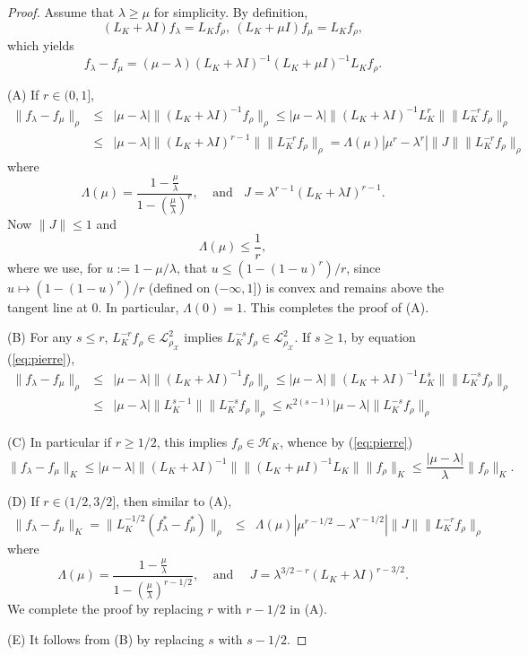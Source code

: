 \documentclass[twoside,11pt]{amsart}
\theoremstyle{theorem}
\theoremstyle{definition}
\theoremstyle{remark}
\def\L{{\mathscr L}}
\def\L2{{\mathscr L}^2_{\rho_\X}}
\def\H{{\mathscr H}}
\def\X{{\mathscr X}}
\def\la{\lambda}
\begin{document}
\begin{proof}
Assume that $\lambda\geq \mu$ for simplicity. By definition,
$$(L_K+\la I)f_\la=L_Kf_\rho,~(L_K+\mu I)f_\mu=L_K f_\rho,$$
which yields
\begin{equation} \label{eq:pierre}
f_\la-f_\mu=(\mu-\lambda)(L_K+\la I)^{-1}(L_K+\mu I)^{-1}L_Kf_\rho.
\end{equation}

(A) If $r\in (0,1]$,
\begin{eqnarray*}
\|f_{\lambda}- f_{\mu}\|_\rho & \leq & |\mu-\lambda|\|(L_K+\la I)^{-1} f_\rho \|_\rho \leq  |\mu-\lambda|\|(L_K+\la I)^{-1} L_K^r \| \|L_K^{-r}f_\rho \|_\rho  \\
& \leq & |\mu-\lambda|\|(L_K+\la I)^{r-1} \| \|L_K^{-r}f_\rho \|_\rho  = \Lambda(\mu) |\mu^r - \lambda^r|  \|J\| \|L_K^{-r} f_\rho\|_\rho
\end{eqnarray*}
where
\[ \Lambda(\mu)=\frac{1-\frac{\mu}{\lambda}}{1-\left(\frac{\mu}{\lambda}\right)^r}, \ \ \ \ \ \mbox{and}\ \ \ \  J= \lambda^{r-1} (L_K+\lambda I)^{r-1}. \]
Now $\|J\|\leq 1$ and 
\[ \Lambda(\mu) \leq \frac{1}{r}, \]
where we use, for $u:=1-\mu/\la$, that
$u\leq(1-(1-u)^r)/r$, since $u\mapsto(1-(1-u)^r)/r$
(defined on $(-\infty,1]$) is convex and remains above the tangent
line at $0$. In particular, $\Lambda(0)=1$. This completes the proof of (A).

(B) For any $s\leq r$, $L_K^{-r}f_\rho\in \L2$ implies $L_K^{-s}f_\rho \in \L2$. If $s\geq 1$, by equation (\ref{eq:pierre}),
\begin{eqnarray*}
\|f_{\lambda}- f_{\mu}\|_\rho & \leq & |\mu-\lambda|\|(L_K+\la I)^{-1} f_\rho \|_\rho \leq  |\mu-\lambda|\|(L_K+\la I)^{-1} L_K^s \| \|L_K^{-s}f_\rho \|_\rho  \\
& \leq & |\mu-\lambda|\|L_K^{s-1} \| \|L_K^{-s}f_\rho \|_\rho  \leq \kappa^{2(s-1)} |\mu-\lambda| \|L_K^{-s}f_\rho \|_\rho 
\end{eqnarray*}

(C) In particular if $r\geq 1/2$, this implies $f_\rho \in \H_K$, whence by (\ref{eq:pierre})
\[ \|f_\la-f_\mu\|_K\leq |\mu-\lambda|\|(L_K+\la I)^{-1}\| \|(L_K+\mu I)^{-1}L_K\| \|f_\rho\|_K \leq \frac{|\mu-\lambda|}{\la}\|f_\rho\|_K. \]

(D) If $r\in (1/2,3/2]$, then similar to (A), 
\begin{eqnarray*}
\|f_\lambda- f_\mu\|_K = \|L^{-1/2}_K (f^\ast_{\lambda}- f^\ast_{\mu})\|_\rho & \leq &
\Lambda(\mu) |\mu^{r-1/2} - \lambda^{r-1/2}|
\|J\| \|L_K^{-r} f_\rho\|_\rho
\end{eqnarray*}
where
\[ \Lambda(\mu)=\frac{1-\frac{\mu}{\la}}{1-\left(\frac{\mu}{\la}\right)^{r-1/2}}, \ \ \ \ \ \mbox{and}\ \ \ \ \ \ J= \la^{3/2-r} (L_K + \la I )^{r-3/2}. \]
We complete the proof by replacing $r$ with $r-1/2$ in (A).

(E) It follows from (B) by replacing $s$ with $s-1/2$. 
\end{proof}
\end{document}
